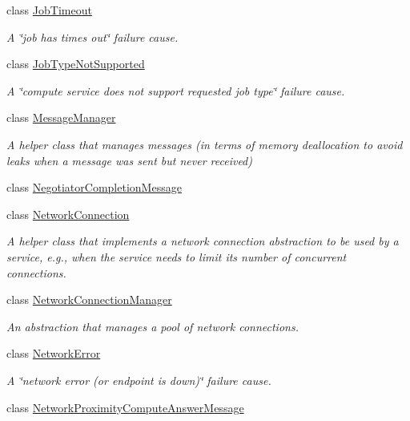 \begin{DoxyCompactItemize}
class \hyperlink{classwrench_1_1_job_timeout}{Job\+Timeout}
\begin{DoxyCompactList}\small\item\em A \char`\"{}job has times out\char`\"{} failure cause. \end{DoxyCompactList}\item 
class \hyperlink{classwrench_1_1_job_type_not_supported}{Job\+Type\+Not\+Supported}
\begin{DoxyCompactList}\small\item\em A \char`\"{}compute service does not support requested job type\char`\"{} failure cause. \end{DoxyCompactList}\item 
class \hyperlink{classwrench_1_1_message_manager}{Message\+Manager}
\begin{DoxyCompactList}\small\item\em A helper class that manages messages (in terms of memory deallocation to avoid leaks when a message was sent but never received) \end{DoxyCompactList}\item 
class \hyperlink{classwrench_1_1_negotiator_completion_message}{Negotiator\+Completion\+Message}
\item 
class \hyperlink{classwrench_1_1_network_connection}{Network\+Connection}
\begin{DoxyCompactList}\small\item\em A helper class that implements a network connection abstraction to be used by a service, e.\+g., when the service needs to limit its number of concurrent connections. \end{DoxyCompactList}\item 
class \hyperlink{classwrench_1_1_network_connection_manager}{Network\+Connection\+Manager}
\begin{DoxyCompactList}\small\item\em An abstraction that manages a pool of network connections. \end{DoxyCompactList}\item 
class \hyperlink{classwrench_1_1_network_error}{Network\+Error}
\begin{DoxyCompactList}\small\item\em A \char`\"{}network error (or endpoint is down)\char`\"{} failure cause. \end{DoxyCompactList}\item 
class \hyperlink{classwrench_1_1_network_proximity_compute_answer_message}{Network\+Proximity\+Compute\+Answer\+Message}

\end{DoxyCompactItemize}

